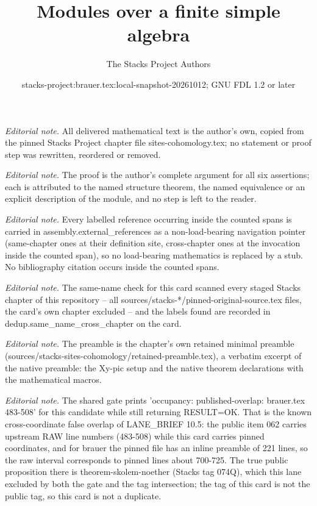 \documentclass[10pt,a4paper]{amsart}
\title{Modules over a finite simple algebra}
\author{The Stacks Project Authors}
\date{stacks-project:brauer.tex:local-snapshot-20261012; GNU FDL 1.2 or later}
\theoremstyle{plain}
\theoremstyle{definition}
\theoremstyle{remark}
\numberwithin{equation}{subsection}
\begin{document}
\maketitle
\noindent\textit{Editorial note.} All delivered mathematical text is the author's own, copied from the pinned Stacks Project chapter file sites-cohomology.tex; no statement or proof step was rewritten, reordered or removed.\par\medskip
\noindent\textit{Editorial note.} The proof is the author's complete argument for all six assertions; each is attributed to the named structure theorem, the named equivalence or an explicit description of the module, and no step is left to the reader.\par\medskip
\noindent\textit{Editorial note.} Every labelled reference occurring inside the counted spans is carried in assembly.external\_references as a non-load-bearing navigation pointer (same-chapter ones at their definition site, cross-chapter ones at the invocation inside the counted span), so no load-bearing mathematics is replaced by a stub. No bibliography citation occurs inside the counted spans.\par\medskip
\noindent\textit{Editorial note.} The same-name check for this card scanned every staged Stacks chapter of this repository -- all sources/stacks-*/pinned-original-source.tex files, the card's own chapter excluded -- and the labels found are recorded in dedup.same\_name\_cross\_chapter on the card.\par\medskip
\noindent\textit{Editorial note.} The preamble is the chapter's own retained minimal preamble (sources/stacks-sites-cohomology/retained-preamble.tex), a verbatim excerpt of the native preamble: the Xy-pic setup and the native theorem declarations with the mathematical macros.\par\medskip
\noindent\textit{Editorial note.} The shared gate prints 'occupancy: published-overlap: brauer.tex 483-508' for this candidate while still returning RESULT=OK. That is the known cross-coordinate false overlap of LANE\_BRIEF 10.5: the public item 062 carries upstream RAW line numbers (483-508) while this card carries pinned coordinates, and for brauer the pinned file has an inline preamble of 221 lines, so the raw interval corresponds to pinned lines about 700-725. The true public proposition there is theorem-skolem-noether (Stacks tag 074Q), which this lane excluded by both the gate and the tag intersection; the tag of this card is not the public tag, so this card is not a duplicate.\par\medskip
\end{document}
